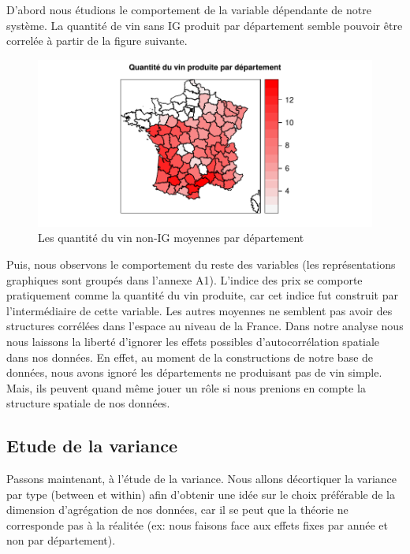 \documentclass[11pt,]{article}
\begin{document}
D'abord nous étudions le comportement de la variable dépendante de notre
système. La quantité de vin sans IG produit par département semble
pouvoir être correlée à partir de la figure suivante.

\FloatBarrier

\begin{figure}[!htbp]

{\centering \includegraphics{note2pres_files/figure-latex/unnamed-chunk-18-1} 

}

\caption{Les quantité du vin non-IG moyennes par département}\label{fig:unnamed-chunk-18}
\end{figure}

\FloatBarrier

Puis, nous observons le comportement du reste des variables (les
représentations graphiques sont groupés dans l'annexe A1). L'indice des
prix se comporte pratiquement comme la quantité du vin produite, car cet
indice fut construit par l'intermédiaire de cette variable. Les autres
moyennes ne semblent pas avoir des structures corrélées dans l'espace au
niveau de la France. Dans notre analyse nous nous laissons la liberté
d'ignorer les effets possibles d'autocorrélation spatiale dans nos
données. En effet, au moment de la constructions de notre base de
données, nous avons ignoré les départements ne produisant pas de vin
simple. Mais, ils peuvent quand même jouer un rôle si nous prenions en
compte la structure spatiale de nos données.

\hypertarget{etude-de-la-variance}{%
\subsection{Etude de la variance}\label{etude-de-la-variance}}

Passons maintenant, à l'étude de la variance. Nous allons décortiquer la
variance par type (between et within) afin d'obtenir une idée sur le
choix préférable de la dimension d'agrégation de nos données, car il se
peut que la théorie ne corresponde pas à la réalitée (ex: nous faisons
face aux effets fixes par année et non par département).
\end{document}
